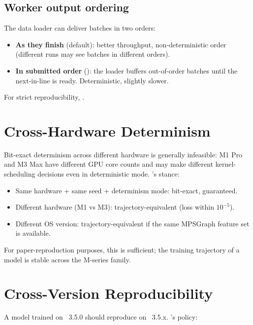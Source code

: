 \subsection{Worker output ordering}
\label{ssec:reproducibility:worker_ordering}

The data loader can deliver batches in two orders:
\begin{itemize}
  \item \textbf{As they finish} (default): better throughput,
    non-deterministic order (different runs may see batches in
    different orders).
  \item \textbf{In submitted order} (): the
    loader buffers out-of-order batches until the next-in-line
    is ready. Deterministic, slightly slower.
\end{itemize}

For strict reproducibility, .

\section{Cross-Hardware Determinism}
\label{sec:reproducibility:cross_hardware}

Bit-exact determinism across different hardware is generally
infeasible: M1 Pro and M3 Max have different GPU core counts
and may make different kernel-scheduling decisions even in
deterministic mode. \Lucid's stance:

\begin{itemize}
  \item Same hardware + same seed + determinism mode:
    bit-exact, guaranteed.
  \item Different hardware (M1 vs M3): trajectory-equivalent
    (loss within $10^{-5}$).
  \item Different OS version: trajectory-equivalent if the
    same MPSGraph feature set is available.
\end{itemize}

For paper-reproduction purposes, this is sufficient; the
training trajectory of a model is stable across the M-series
family.

\section{Cross-Version Reproducibility}
\label{sec:reproducibility:cross_version}

A model trained on \Lucid\ 3.5.0 should reproduce on \Lucid\
3.5.x. \Lucid's policy:


